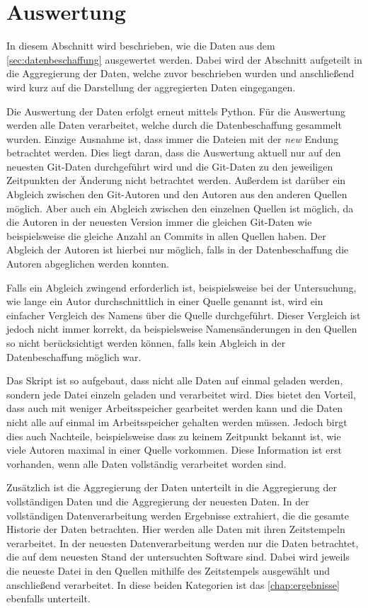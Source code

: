 \section{Auswertung}
\label{sec:auswertung}
In diesem Abschnitt wird beschrieben, wie die Daten aus dem \autoref{sec:datenbeschaffung} ausgewertet werden.
Dabei wird der Abschnitt aufgeteilt in die Aggregierung der Daten, welche zuvor beschrieben wurden und anschließend wird kurz auf die Darstellung der aggregierten Daten eingegangen.

Die Auswertung der Daten erfolgt erneut mittels Python.
Für die Auswertung werden alle Daten verarbeitet, welche durch die Datenbeschaffung gesammelt wurden.
Einzige Ausnahme ist, dass immer die Dateien mit der \emph{new} Endung betrachtet werden.
Dies liegt daran, dass die Auswertung aktuell nur auf den neuesten Git-Daten durchgeführt wird und die Git-Daten zu den jeweiligen Zeitpunkten der Änderung nicht betrachtet werden.
Außerdem ist darüber ein Abgleich zwischen den Git-Autoren und den Autoren aus den anderen Quellen möglich.
Aber auch ein Abgleich zwischen den einzelnen Quellen ist möglich, da die Autoren in der neuesten Version immer die gleichen Git-Daten wie beispielsweise die gleiche Anzahl an Commits in allen Quellen haben.
Der Abgleich der Autoren ist hierbei nur möglich, falls in der Datenbeschaffung die Autoren abgeglichen werden konnten.

Falls ein Abgleich zwingend erforderlich ist, beispielsweise bei der Untersuchung, wie lange ein Autor durchschnittlich in einer Quelle genannt ist, wird ein einfacher Vergleich des Namens über die Quelle durchgeführt.
Dieser Vergleich ist jedoch nicht immer korrekt, da beispielsweise Namensänderungen in den Quellen so nicht berücksichtigt werden können, falls kein Abgleich in der Datenbeschaffung möglich war.

Das Skript ist so aufgebaut, dass nicht alle Daten auf einmal geladen werden, sondern jede Datei einzeln geladen und verarbeitet wird.
Dies bietet den Vorteil, dass auch mit weniger Arbeitsspeicher gearbeitet werden kann und die Daten nicht alle auf einmal im Arbeitsspeicher gehalten werden müssen.
Jedoch birgt dies auch Nachteile, beispielsweise dass zu keinem Zeitpunkt bekannt ist, wie viele Autoren maximal in einer Quelle vorkommen.
Diese Information ist erst vorhanden, wenn alle Daten vollständig verarbeitet worden sind.

Zusätzlich ist die Aggregierung der Daten unterteilt in die Aggregierung der vollständigen Daten und die Aggregierung der neuesten Daten.
In der vollständigen Datenverarbeitung werden Ergebnisse extrahiert, die die gesamte Historie der Daten betrachten.
Hier werden alle Daten mit ihren Zeitstempeln verarbeitet.
In der neuesten Datenverarbeitung werden nur die Daten betrachtet, die auf dem neuesten Stand der untersuchten Software sind.
Dabei wird jeweils die neueste Datei in den Quellen mithilfe des Zeitstempels ausgewählt und anschließend verarbeitet.
In diese beiden Kategorien ist das \autoref{chap:ergebnisse} ebenfalls unterteilt.

